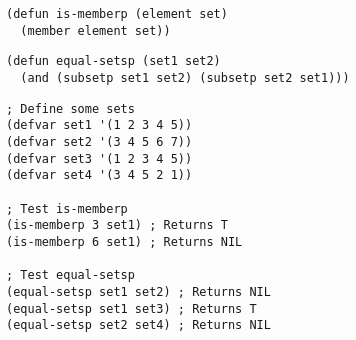 \documentclass{article}
\begin{document}
\begin{verbatim}
(defun is-memberp (element set)
  (member element set))
\end{verbatim}
\begin{verbatim}
(defun equal-setsp (set1 set2)
  (and (subsetp set1 set2) (subsetp set2 set1)))
\end{verbatim}
\begin{verbatim}
; Define some sets
(defvar set1 '(1 2 3 4 5))
(defvar set2 '(3 4 5 6 7))
(defvar set3 '(1 2 3 4 5))
(defvar set4 '(3 4 5 2 1))

; Test is-memberp
(is-memberp 3 set1) ; Returns T
(is-memberp 6 set1) ; Returns NIL

; Test equal-setsp
(equal-setsp set1 set2) ; Returns NIL
(equal-setsp set1 set3) ; Returns T
(equal-setsp set2 set4) ; Returns NIL
\end{verbatim}
\end{document}
